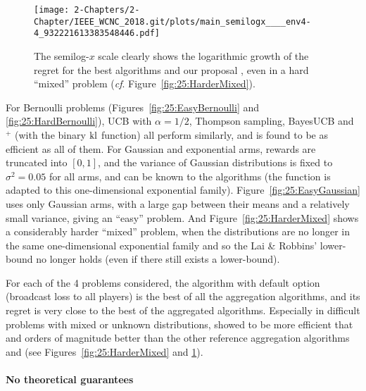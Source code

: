 \begin{figure}[b!]  %
	\centering
	\texttt{[image: 2-Chapters/2-Chapter/IEEE\_WCNC\_2018.git/plots/main\_semilogx\_\_\_\_env4-4\_932221613383548446.pdf]}
	\caption{The semilog-$x$ scale clearly shows the logarithmic growth of the regret for the best algorithms and our proposal \Aggr, even in a hard ``mixed'' problem (\emph{cf}. Figure~\ref{fig:25:HarderMixed}).}
	\label{fig:25:HarderMixed_semilogx}
\end{figure}

For Bernoulli problems (Figures~\ref{fig:25:EasyBernoulli} and \ref{fig:25:HardBernoulli}), UCB with $\alpha=1/2$, Thompson sampling, BayesUCB and \klUCB{}$^+$ (with the binary $\mathrm{kl}$ function) all perform similarly, and \Aggr{} is found to be as efficient as all of them.
For Gaussian and exponential arms, rewards are truncated into $[0,1]$, and the variance of Gaussian distributions is fixed to $\sigma^2 = 0.05$ for all arms, and can be known to the algorithms (the \kl{} function is adapted to this one-dimensional exponential family).
%
Figure~\ref{fig:25:EasyGaussian} uses only Gaussian arms, with a large gap between their means and a relatively small variance, giving an ``easy'' problem.
%
And Figure~\ref{fig:25:HarderMixed} shows a considerably harder ``mixed'' problem, when the distributions are no longer in the same one-dimensional exponential family and so the Lai \& Robbins' lower-bound no longer holds (even if there still exists a lower-bound).

For each of the 4 problems considered, the \Aggr{} algorithm with default option (broadcast loss to all players) is the best of all the aggregation algorithms,
and its regret is very close to the best of the aggregated algorithms.
Especially in difficult problems with mixed or unknown distributions, \Aggr{} showed to be more efficient that \ExpQ{} and orders of magnitude better than the other reference aggregation algorithms \LearnExp{} and \CORRAL{} (see Figures~\ref{fig:25:HarderMixed} and \ref{fig:25:HarderMixed_semilogx}).


\paragraph{No theoretical guarantees}\label{sub:25:theory}

